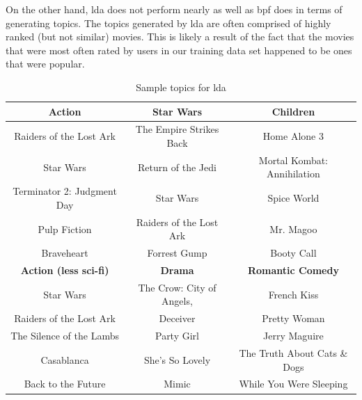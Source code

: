 \documentclass{article} %
\begin{document}
On the other hand, \gls{lda} does not perform nearly as well as \gls{bpf} does in terms of generating topics. The topics generated by \gls{lda} are often comprised of highly ranked (but not similar) movies. This is likely a result of the fact that the movies that were most often rated by users in our training data set happened to be ones that were popular.
\begin{table}[h]
    \begin{tabularx}{\textwidth}{	ccc} \toprule
    \textbf{Action}                     & \textbf{Star Wars}               & \textbf{Children}                    \\ \midrule
    Raiders of the Lost Ark    & The Empire Strikes Back & Home Alone 3                \\
    Star Wars                  & Return of the Jedi      & Mortal Kombat: Annihilation \\
    Terminator 2: Judgment Day & Star Wars               & Spice World                 \\
    Pulp Fiction               & Raiders of the Lost Ark & Mr. Magoo                   \\
    Braveheart                 & Forrest Gump            & Booty Call                   \vspace{3mm} \\  \toprule
    \textbf{Action (less sci-fi)}     & \textbf{Drama}                     & \textbf{Romantic Comedy}              \\ \midrule
    Star Wars                & The Crow: City of Angels, & French Kiss                  \\
    Raiders of the Lost Ark  & Deceiver                  & Pretty Woman                 \\
    The Silence of the Lambs & Party Girl                & Jerry Maguire                \\
    Casablanca               & She's So Lovely           & The Truth About Cats \& Dogs \\
    Back to the Future       & Mimic                     & While You Were Sleeping      \\
    \end{tabularx}
    \caption {Sample topics for \gls{lda}}
\end{table}
\end{document}
